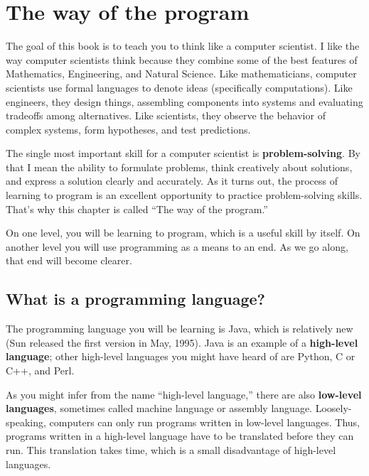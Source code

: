 \documentclass[12pt]{book}
\theoremstyle{definition}
\begin{document}


\setcounter{tocdepth}{1}
\tableofcontents


\chapter{The way of the program}
\label{chap01}

The goal of this book is to teach you to think like a
computer scientist.  I like the way computer scientists think because
they combine some of the best features of Mathematics, Engineering,
and Natural Science.  Like mathematicians, computer scientists use formal
languages to denote ideas (specifically computations).  Like
engineers, they design things, assembling components into systems and
evaluating tradeoffs among alternatives.  Like scientists,
they observe the behavior of complex systems, form hypotheses, and test
predictions.

The single most important skill for a computer scientist is {\bf
problem-solving}.  By that I mean the ability to formulate problems,
think creatively about solutions, and express a solution clearly and
accurately.  As it turns out, the process of learning to program is an
excellent opportunity to practice problem-solving skills.  That's why
this chapter is called ``The way of the program.''

On one level, you will be learning to program, which is a useful
skill by itself.  On another level you will use programming
as a means to an end.  As we go along, that end will
become clearer.

\section{What is a programming language?}

The programming language you will be learning is Java, which is
relatively new (Sun released the first version in May, 1995).  Java is
an example of a {\bf high-level language}; other high-level languages
you might have heard of are Python, C or C++, and Perl.

As you might infer from the name ``high-level language,'' there are
also {\bf low-level languages}, sometimes called machine
language or assembly language.  Loosely-speaking, computers can only
run programs written in low-level languages.  Thus, programs
written in a high-level language have to be translated before they can
run.  This translation takes time, which is a small disadvantage
of high-level languages.
\end{document}
